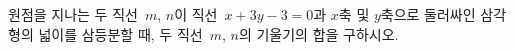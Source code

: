 원점을 지나는 두 직선~$m$, $n$이 직선~$x+3y-3=0$과 $x$축 및 $y$축으로 둘러싸인 삼각형의 넓이를 삼등분할 때, 두 직선~$m$, $n$의 기울기의 합을 구하시오.
